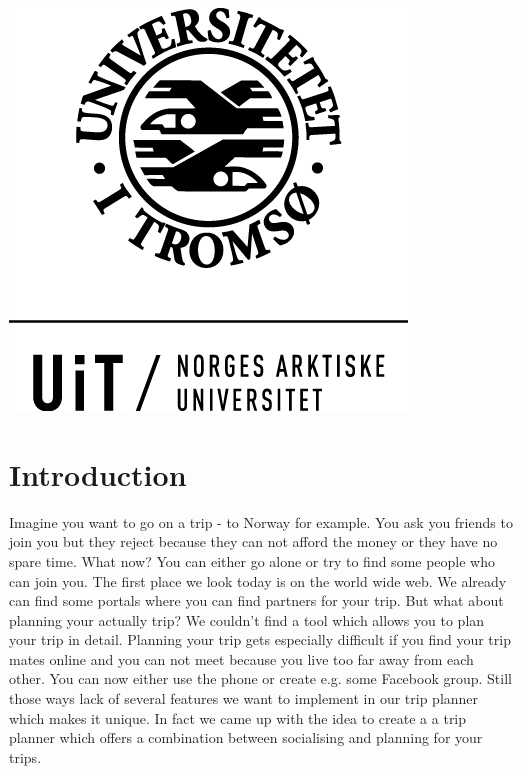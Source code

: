 \documentclass[a4paper]{article}
\begin{document}
\begin{titlepage}
\includegraphics{pictures/UiT_samarbeidslogo_bokmal_300ppi.png}\\[1cm] 
 

\vfill %

\end{titlepage}

\tableofcontents
\pagebreak


\section{Introduction}
Imagine you want to go on a trip - to Norway for example. You ask you friends to join you but they reject because they can not afford the money or they have no spare time. What now? You can either go alone or try to find some people who can join you. The first place we look today is on the world wide web. We already can find some portals where you can find partners for your trip. But what about planning your actually trip? We couldn’t find a tool which allows you to plan your trip in detail. Planning your trip gets especially difficult if you find your trip mates online and you can not meet because you live too far away from each other. You can now either use the phone or create e.g. some Facebook group. Still those ways lack of several features we want to implement in our trip planner which makes it unique. In fact we came up with the idea to create a a trip planner which offers a combination between socialising and planning for your trips.
\end{document}
